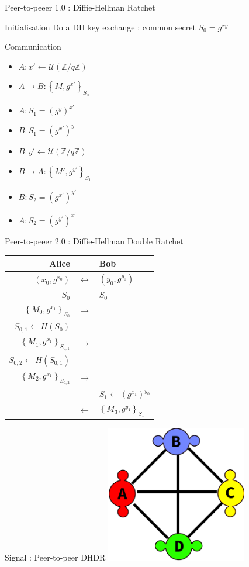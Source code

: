 \documentclass{beamer}
\newcommand{\ZZ}{\mathbb{Z}}
\newcommand{\Uu}{\mathcal{U}}
\newcommand{\la}{\leftarrow}
\newcommand{\ra}{\rightarrow}
\newcommand{\Lla}{\longleftarrow}
\newcommand{\Lra}{\longrightarrow}
\newcommand{\Llra}{\longleftrightarrow}
\newcommand{\set}[1]{\left\{ #1 \right\}}
\begin{document}
\begin{frame}{Peer-to-peeer 1.0 : Diffie-Hellman Ratchet}
	\begin{block}{Initialisation}
		Do a DH key exchange : common secret $S_0 = g^{xy}$
	\end{block}

	\begin{block}{Communication}
		\begin{itemize}
			\item $A : x' \la \Uu(\ZZ / q \ZZ)$
			\item $A \ra B : \set{M, g^{x'}}_{S_0}$
			\item $A : S_1 = (g^y)^{x'}$
			\item $B : S_1 = (g^{x'})^y$ 
			\item $B : y' \la \Uu(\ZZ / q \ZZ)$
			\item $B \ra A : \set{M', g^{y'}}_{S_1}$
			\item $B : S_2 = (g^{x'})^{y'}$ 
			\item $A : S_2 = (g^{y'})^{x'}$ 
		\end{itemize}
	\end{block}
\end{frame}

\begin{frame}{Peer-to-peeer 2.0 : Diffie-Hellman Double Ratchet}
	\center
	\begin{tabular}{rcl}
		Alice & & Bob \\
		\hline
    $(x_0, g^{x_0})$ & $\Llra$ & $(y_0, g^{y_0})$ \\
		\hline
		$S_0$ & & $S_0$ \\
		\hline
		$\set{M_0, g^{x_1}}_{S_0}$ & $\Lra$ & \\
		\hline
		$S_{0, 1} \la H(S_0)$  & & \\
		\hline
		$\set{M_1, g^{x_1}}_{S_{0, 1}}$ & $\Lra$ & \\
		\hline
		$S_{0, 2} \la H(S_{0, 1})$  & & \\
		\hline
		$\set{M_2, g^{x_1}}_{S_{0, 2}}$ & $\Lra$ & \\
		\hline
		 & & $S_1 \la (g^{x_1})^{y_0}$ \\
		\hline
		 & $\Lla$ & $\set{M_3, g^{y_1}}_{S_1}$
	\end{tabular}
\end{frame}

\begin{frame}{Signal : Peer-to-peer DHDR}
	\center
	\includegraphics[height=6cm]{img/group_p2p.png}
\end{frame}
\end{document}
